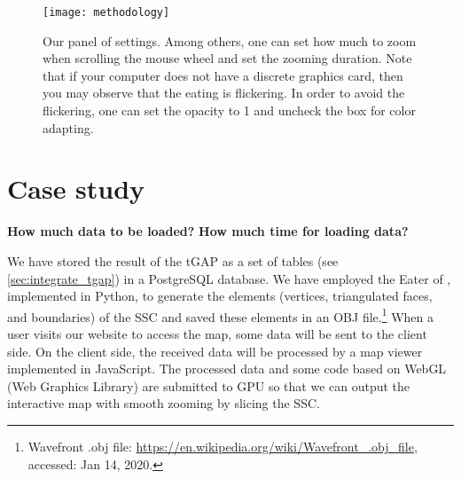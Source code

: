 \documentclass[]{interact}
\begin{document}
\begin{figure}[tb]
\centering
\texttt{[image: methodology]}
\caption{Our panel of settings. 
Among others, one can set how much to zoom when scrolling the mouse wheel 
and set the zooming duration. 
Note that if your computer does not have a discrete graphics card, 
then you may observe that the eating is flickering.
In order to avoid the flickering, 
one can set the opacity to 1 and uncheck the box for color adapting.}
\label{fig:interaction_settings}
\end{figure}





\section{Case study}
\label{sec:case_study}


\textbf{How much data to be loaded?}
\textbf{How much time for loading data?}


We have stored the result of the tGAP 
as a set of tables (see \sect\ref{sec:integrate_tgap}) 
in a PostgreSQL database.
We have employed the Eater of \citet{Suba2014Merge},
implemented in Python, 
to generate the elements
(vertices, triangulated faces, and boundaries)
of the SSC \citep{vanOosterom2014tGAPSSC} 
and saved these elements in an OBJ file.\footnote{%
Wavefront .obj file:
\url{https://en.wikipedia.org/wiki/Wavefront_.obj_file},
accessed: Jan 14, 2020.}
%
When a user visits our website to access the map,
some data will be sent to the client side.  
On the client side,
the received data will be processed
by a map viewer implemented in JavaScript.
The processed data and some code based on WebGL (Web Graphics Library)
are submitted to GPU so that we can output the interactive map with smooth zooming
by slicing the SSC.
\end{document}
